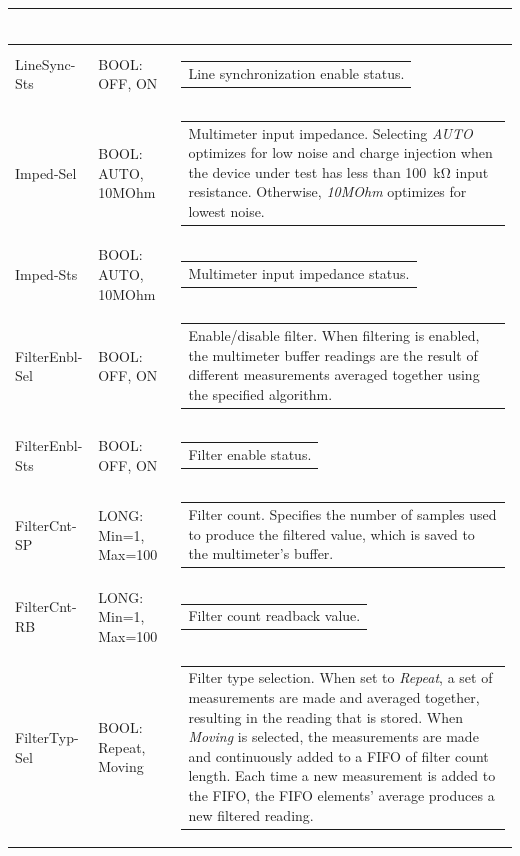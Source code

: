 \documentclass[openany]{article}
\begin{document}
\begin{longtable}{| m{3.0cm} m{4.5cm} m{7.0cm} |}
\begin{tabular}{@{}m{6cm}@{}}
						\end{tabular} \\ \hline
		LineSync-Sts & BOOL: OFF, ON & \begin{tabular}{@{}m{6cm}@{}}
	    					Line synchronization enable status.
						\end{tabular} \\ \hline
		Imped-Sel & BOOL: AUTO, 10MOhm & \begin{tabular}{@{}m{6cm}@{}}
	    					Multimeter input impedance. Selecting \emph{AUTO} optimizes for low noise and charge injection when the device under test has less than \SI{100}{\kohm} input resistance. Otherwise, \emph{10MOhm} optimizes for lowest noise.
						\end{tabular} \\ \hline
		Imped-Sts & BOOL: AUTO, 10MOhm & \begin{tabular}{@{}m{6cm}@{}}
	    					Multimeter input impedance status.
						\end{tabular} \\ \hline
		FilterEnbl-Sel & BOOL: OFF, ON & \begin{tabular}{@{}m{6cm}@{}}
	    					Enable/disable filter. When filtering is enabled, the multimeter buffer readings are the result of different measurements averaged together using the specified algorithm.
						\end{tabular} \\ \hline
		FilterEnbl-Sts & BOOL: OFF, ON & \begin{tabular}{@{}m{6cm}@{}}
	    					Filter enable status.
						\end{tabular} \\ \hline
		FilterCnt-SP & LONG: Min=1, Max=100 & \begin{tabular}{@{}m{6cm}@{}}
	    					Filter count. Specifies the number of samples used to produce the filtered value, which is saved to the multimeter's buffer.
						\end{tabular} \\ \hline
		FilterCnt-RB & LONG: Min=1, Max=100 & \begin{tabular}{@{}m{6cm}@{}}
	    					Filter count readback value.
						\end{tabular} \\ \hline
		FilterTyp-Sel & BOOL: Repeat, Moving & \begin{tabular}{@{}m{6cm}@{}}
	    					Filter type selection. When set to \emph{Repeat}, a set of measurements are made and averaged together, resulting in the reading that is stored. When \emph{Moving} is selected, the measurements are made and continuously added to a FIFO of filter count length. Each time a new measurement is added to the FIFO, the FIFO elements' average produces a new filtered reading.

\end{tabular}
\end{longtable}
\end{document}
